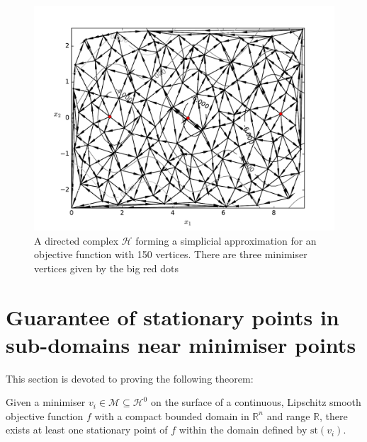 \begin{figure} 
\centerline{\includegraphics[scale=1.0]{./Fig8.pdf}}
{\caption{A directed complex $\mathcal{H}$ forming a simplicial approximation for an objective function with 150 vertices. There are three minimiser vertices given by the big red dots} \label{fig:alp100}}
\end{figure}

\section{Guarantee of stationary points in sub-domains near minimiser points}
This section is devoted to proving the following theorem:
\begin{theorem} \label{theor:stat}
Given a minimiser $v_i \in \mathcal{M} \subseteq \mathcal{H}^0$ on the surface of a continuous, Lipschitz smooth objective function $f$ with a compact bounded domain in $\mathbb{R}^n$ and range $\mathbb{R}$, there exists at least one stationary point of $f$ within the domain defined by $\textrm{st}\left( v_i \right)$.
\end{theorem}

